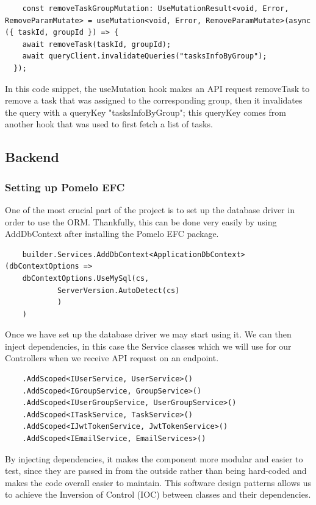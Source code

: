 \documentclass[singlespacing,12pt,parskip,headsepline,consistentlayout]{article}
\begin{document}
\begin{lstlisting}
    const removeTaskGroupMutation: UseMutationResult<void, Error, RemoveParamMutate> = useMutation<void, Error, RemoveParamMutate>(async ({ taskId, groupId }) => {
    await removeTask(taskId, groupId);
    await queryClient.invalidateQueries("tasksInfoByGroup");
  });
\end{lstlisting}

In this code snippet, the useMutation hook makes an API request removeTask to remove a task that was assigned to the corresponding group, then it invalidates the query with a queryKey "tasksInfoByGroup"; this queryKey comes from another hook that was used to first fetch a list of tasks.

\pagebreak
\subsection{Backend}

\subsubsection{Setting up Pomelo EFC}

One of the most crucial part of the project is to set up the database driver in order to use the ORM. Thankfully, this can be done very easily by using AddDbContext after installing the Pomelo EFC package. 

\begin{lstlisting}
    builder.Services.AddDbContext<ApplicationDbContext>(dbContextOptions =>
    dbContextOptions.UseMySql(cs,
            ServerVersion.AutoDetect(cs)
            )
    )
\end{lstlisting}

Once we have set up the database driver we may start using it. We can then inject dependencies, in this case the Service classes which we will use for our Controllers when we receive API request on an endpoint.

\begin{lstlisting}
    .AddScoped<IUserService, UserService>()
    .AddScoped<IGroupService, GroupService>()
    .AddScoped<IUserGroupService, UserGroupService>()
    .AddScoped<ITaskService, TaskService>()
    .AddScoped<IJwtTokenService, JwtTokenService>()
    .AddScoped<IEmailService, EmailServices>()
\end{lstlisting}

By injecting dependencies, it makes the component more modular and easier to test, since they are passed in from the outside rather than being hard-coded and makes the code overall easier to maintain. This software design patterns allows us to achieve the Inversion of Control (IOC) between classes and their dependencies. \cite{dotnetDocs}
\end{document}
